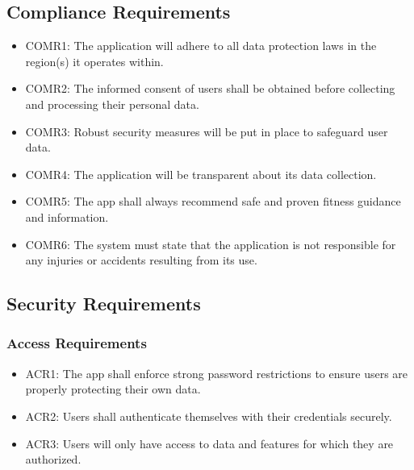 \documentclass[12pt]{article}
\begin{document}
\subsection{Compliance Requirements}
\begin{itemize}
\item COMR1: The application will adhere to all data protection laws in the region(s) it operates within.
\item COMR2: The informed consent of users shall be obtained before collecting and processing their personal data.
\item COMR3: Robust security measures will be put in place to safeguard user data.
\item COMR4: The application will be transparent about its data collection.
\item COMR5: The app shall always recommend safe and proven fitness guidance and information.
\item COMR6: The system must state that the application is not responsible for any injuries or accidents resulting from its use.
\end{itemize}

\subsection{Security Requirements}
\subsubsection{Access Requirements}
\begin{itemize}
    \item ACR1: The app shall enforce strong password restrictions to ensure users are properly protecting their own data.
    \item ACR2: Users shall authenticate themselves with their credentials securely.
    \item ACR3: Users will only have access to data and features for which they are authorized.
\end{itemize}
\end{document}
